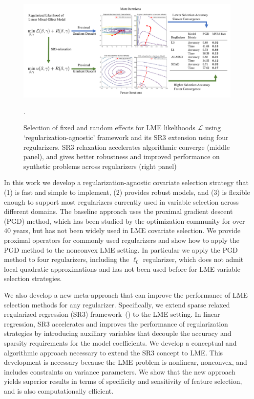 \begin{figure}[H]
    \centering
    \includegraphics[width=\textwidth]{figures/summary_picture.pdf}
    \caption{Selection of fixed and random effects for LME likelihoods $\mathcal{L}$ using 
    `regularization-agnostic' framework and its SR3 extension using four regularizers. 
    SR3 relaxation accelerates algorithmic converge  (middle panel), and gives better robustness and improved performance on synthetic problems across regularizers (right panel)}.
    \label{fig:summary}
\end{figure}

In this work we develop a regularization-agnostic covariate selection strategy that (1) is fast and simple to implement, (2) provides robust models, and (3) is flexible enough to support most regularizers currently used in variable selection across different domains.  The baseline approach uses the proximal gradient descent (PGD) method, which has been studied by the optimization community for over 40 years, but has not been widely used in LME covariate selection. We provide proximal operators for commonly used regularizers and show how to apply the PGD method to the nonconvex LME setting. In particular we apply the PGD method to four regularizers, 
including the $\ell_0$ regularizer, which does not admit local quadratic approximations and has not been used before for LME variable selection strategies. 

We also develop a new meta-approach that can improve the performance of LME selection methods for any regularizer. Specifically, we extend sparse relaxed regularized regression (SR3) framework~{(\cite{Zheng2019SR3})} to the LME setting. In linear regression, SR3 accelerates and improves the performance of  regularization strategies by introducing auxiliary variables that decouple the accuracy and sparsity requirements for the model coefficients.
We develop a conceptual and algorithmic approach necessary to extend the SR3 concept to LME.  This development is necessary because the LME problem is nonlinear, nonconvex, and includes constraints on variance parameters.  We show that the new approach yields superior results in terms of specificity and sensitivity of feature selection, and is also computationally efficient.  

